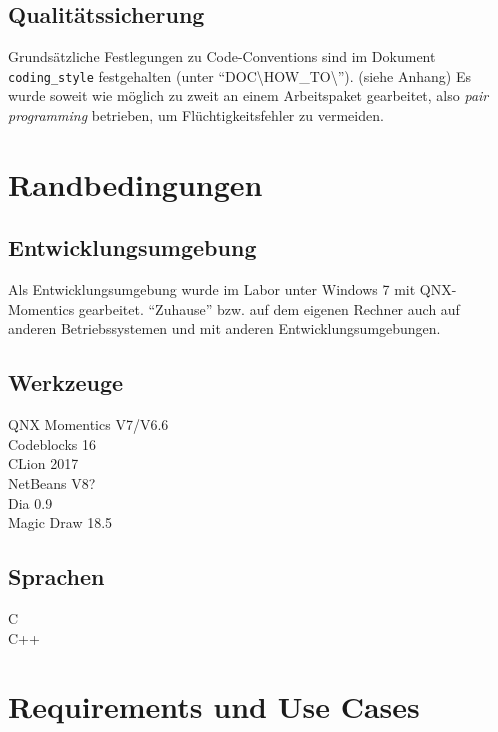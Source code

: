 \documentclass[
   draft=false
  ,paper=a4
  ,twoside=true
  ,fontsize=11pt
  ,headsepline
  ,DIV11
  ,parskip=full+
]{scrartcl} %
\begin{document}
\subsection{Qualitätssicherung} %
Grundsätzliche Festlegungen zu Code-Conventions sind im Dokument \texttt{coding\_style} festgehalten (unter ``DOC\textbackslash HOW\_TO\textbackslash''). (siehe Anhang)
Es wurde soweit wie möglich zu zweit an einem Arbeitspaket gearbeitet, also \emph{pair programming} betrieben, um Flüchtigkeitsfehler zu vermeiden. 

\section{Randbedingungen}
\subsection{Entwicklungsumgebung}
Als Entwicklungsumgebung wurde im Labor unter Windows 7 mit QNX-Momentics gearbeitet. ``Zuhause'' bzw. auf dem eigenen Rechner auch auf anderen Betriebssystemen und mit anderen Entwicklungsumgebungen.

\subsection{Werkzeuge}

\begin{description}
\item[QNX Momentics V7/V6.6] 
\item[Codeblocks 16] 
\item[CLion 2017]
\item[NetBeans V8?] 
\item[Dia 0.9] 
\item[Magic Draw 18.5] 
\end{description}

\subsection{Sprachen}

\begin{description}
\item[C] %
\item[C++] 

\end{description}

\section{Requirements und Use Cases}
\end{document}

